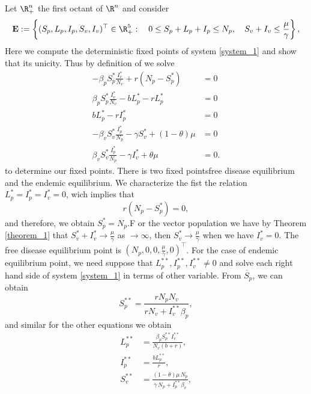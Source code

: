 
Let $\R^n_+$ the first octant of $\R ^ n$ and consider  
$$	{
	\mathbf{E}:= 
		\left \{ 
			(S_p, L_p, I_p, S_v, I_v)^{\top} \in \R^5_+: \quad
			0\leq S_p + L_p + I_p \leq N_p, \quad
			S_v + I_v \leq \frac{\mu}{\gamma}
		\right \},
	}
$$
Here we compute the deterministic fixed points of system 
\eqref{system_1} and show that its unicity. Thus by definition of we solve 
%
\begin{equation}
	\begin{aligned}
		-\beta_p S_p^* \frac{I_v^*}{N_v} + r(N_p-S_p^*) &= 0\\
		\beta_p S_p^* \frac{I_v^*}{N_v} - b L_p^* - r L_p^* &= 0\\
		b L_p^* - r I_p^* &= 0\\
		-\beta_v S_v^* \frac{I_p^*}{N_p} -\gamma S_v^* +(1-\theta) \mu &= 0\\
		\beta_v S_v^* \frac{I_p^*}{N_p} -\gamma I_v^* + \theta \mu &= 0.
	\end{aligned}
\end{equation}
to determine our fixed points.
%
There is two fixed points\textemdash free disease equilibrium and the 
endemic equilibrium. We characterize the fist the relation
$ L^*_p=I_p^*=I_v^*=0$, wich implies that
%
\begin{equation*}
	r(N_p-S^*_p) = 0,
\end{equation*}
%
and therefore, we obtain $S_p^*=N_p$.F or the vector population we have by 
Theorem \eqref{theorem_1} that $S_v^*+I_v^* \rightarrow \frac{\mu}{\gamma}$ as 
$\rightarrow \infty$, then $S_v^* \rightarrow \frac{\mu}{\gamma}$ when we have 
$I^*_v=0$.
%
The free disease equilibrium point is $(N_p,0,0,\frac{\mu}{\gamma},0)^{\top}$. 
For the case of endemic equilibrium point, we need suppose that $L_p^{**},I_p^{**},I_
v^{**}\neq0$ and solve each right hand side of system \eqref{system_1} in terms 
of other variable.
%
From $\dot{S_p}$, we can obtain
%
\begin{equation*}
	S^{**}_p= \frac{rN_{{p}}N_{{v}}}{rN_{{v}}+I^{**}_v\beta_{{p}}},
\end{equation*}
%
 and similar for the other equations we obtain
\begin{equation*}
	\begin{aligned}
		L^{**}_p &= \frac{\beta_{{p}}S_p^{**} I_v^{**}}{N_{{v}} \left( b+r \right)},
		\\
		I^{**}_p &=\frac{b L^{**}_p}{r},
		\\
		S^{**}_v &=
			\frac{
				\left( 
					1-\theta 
				\right) 
				\mu\, N_{p}
			}{
				\gamma\, N_{p} + I^{**}_ p
				\beta_{v}
			},
	\end{aligned}
\end{equation*}
